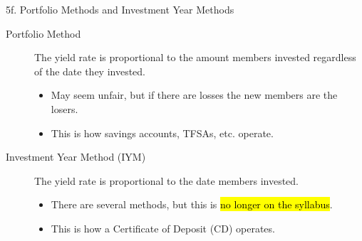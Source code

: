 \begin{CHPT_SUMM_AUTO}[label = {L.-5f}]{5f. Portfolio Methods and Investment Year Methods}
\begin{description}
	\item[Portfolio Method]	The yield rate is proportional to the amount members invested regardless of the date they invested.
		\begin{itemize}[leftmargin = *]
		\item	May seem unfair, but if there are losses the new members are the losers.
		\item	This is how savings accounts, TFSAs, etc. operate.
		\end{itemize}
	\item[Investment Year Method (IYM)]	The yield rate is proportional to the date members invested.
		\begin{itemize}[leftmargin = *]
		\item	There are several methods, but this is \hl{no longer on the syllabus}.
		\item	This is how a Certificate of Deposit (CD) operates.
		\end{itemize}
\end{description}
\end{CHPT_SUMM_AUTO}


